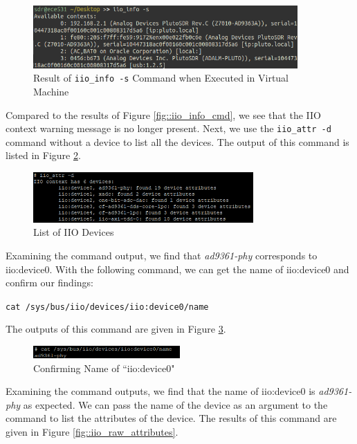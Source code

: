 \documentclass{article}
\begin{document}
\begin{figure}[H]
	\centerline{\includegraphics[width=0.9\textwidth]{iio_info_vm.png}}
	\caption{Result of \texttt{iio\_info -s} Command when Executed in Virtual Machine}
	\label{fig::iio_info_vm}
\end{figure}

Compared to the results of Figure \ref{fig::iio_info_cmd}, we see that the IIO context warning message is no longer present. Next, we use the \texttt{iio\_attr -d} command without a device to list all the devices. The output of this command is listed in Figure \ref{fig::iio_devices}.

\begin{figure}[H]
	\centerline{\includegraphics[width=0.75\textwidth]{iio_devices.png}}
	\caption{List of IIO Devices}
	\label{fig::iio_devices}
\end{figure}


Examining the command output, we find that \textit{ad9361-phy} corresponds to iio:device0. With the following command, we can get the name of iio:device0 and confirm our findings:

\begin{center}
\texttt{cat /sys/bus/iio/devices/iio:device0/name}
\end{center}

The outputs of this command are given in Figure \ref{fig::iio_device0_name}.

\begin{figure}[H]
	\centerline{\includegraphics[width=0.5\textwidth]{iio_device0_name.png}}
	\caption{Confirming Name of ``iio:device0"}
	\label{fig::iio_device0_name}
\end{figure}

Examining the command outputs, we find that the name of iio:device0 is \textit{ad9361-phy} as expected. We can pass the name of the device as an argument to the  command to list the attributes of the device. The results of this command are given in Figure \ref{fig::iio_raw_attributes}.
\end{document}
